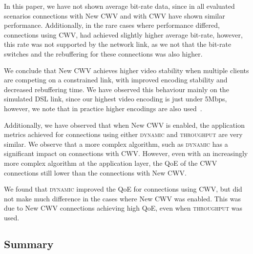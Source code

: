 \documentclass[10pt,sigconf]{acmart}
\begin{document}
In this paper, we have not shown average bit-rate data, since in all evaluated scenarios connections with New CWV and with CWV have shown similar performance. Additionally, in the rare cases where performance differed, connections using CWV, had achieved slightly higher average bit-rate, however, this rate was not supported by the network link, as we not that the bit-rate switches and the rebuffering for these connections was also higher.

We conclude that New CWV achieves higher video stability when multiple clients are competing on a constrained link, with improved encoding stability and decreased rebuffering time. We have observed this behaviour mainly on the simulated DSL link, since our highest video encoding is just under 5Mbps, however, we note that in practice higher encodings are also used~\cite{online-youtube-encodings}.

Additionally, we have observed that when New CWV is enabled, the application metrics achieved for connections using either \textsc{dynamic} and \textsc{throughput} are very similar. We observe that a more complex algorithm, such as \textsc{dynamic} has a significant impact on connections with CWV. However, even with an increasingly more complex algorithm at the application layer, the QoE of the CWV connections still lower than the connections with New CWV.

We found that \textsc{dynamic} improved the QoE for connections using CWV, but did not make much difference in the cases where New CWV was enabled. This was due to New CWV connections achieving high QoE, even when \textsc{throughput} was used.

\subsection{Summary}
\label{sec:summary}
\end{document}
